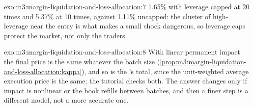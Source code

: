 \begin{solution}{exo:m3:margin-liquidation-and-loss-allocation:7}
1.65\% with leverage capped at 20 times and 5.37\% at 10 times, against 1.11\% uncapped: the cluster of high-leverage
 near the entry is what makes a small shock dangerous, so leverage caps protect the market, not only
the traders.
\end{solution}

\begin{solution}{exo:m3:margin-liquidation-and-loss-allocation:8}
With linear permanent impact the final price is the same whatever the batch size
(\cref{prop:m3:margin-liquidation-and-loss-allocation:kappa}), and so is the 's total, since the unit-weighted
average execution price is the same; the tutorial checks both. The answer changes only if impact is nonlinear or the book
refills between batches, and then a finer step is a different model, not a more accurate one.
\end{solution}

